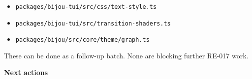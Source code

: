 \begin{itemize}
\item
  \texttt{p\allowbreak{}a\allowbreak{}c\allowbreak{}k\allowbreak{}a\allowbreak{}g\allowbreak{}e\allowbreak{}s\allowbreak{}/\allowbreak{}b\allowbreak{}i\allowbreak{}j\allowbreak{}o\allowbreak{}u\allowbreak{}-\allowbreak{}t\allowbreak{}u\allowbreak{}i\allowbreak{}/\allowbreak{}s\allowbreak{}r\allowbreak{}c\allowbreak{}/\allowbreak{}c\allowbreak{}s\allowbreak{}s\allowbreak{}/\allowbreak{}t\allowbreak{}e\allowbreak{}x\allowbreak{}t\allowbreak{}-\allowbreak{}s\allowbreak{}t\allowbreak{}y\allowbreak{}l\allowbreak{}e\allowbreak{}.\allowbreak{}t\allowbreak{}s}
\item
  \texttt{p\allowbreak{}a\allowbreak{}c\allowbreak{}k\allowbreak{}a\allowbreak{}g\allowbreak{}e\allowbreak{}s\allowbreak{}/\allowbreak{}b\allowbreak{}i\allowbreak{}j\allowbreak{}o\allowbreak{}u\allowbreak{}-\allowbreak{}t\allowbreak{}u\allowbreak{}i\allowbreak{}/\allowbreak{}s\allowbreak{}r\allowbreak{}c\allowbreak{}/\allowbreak{}t\allowbreak{}r\allowbreak{}a\allowbreak{}n\allowbreak{}s\allowbreak{}i\allowbreak{}t\allowbreak{}i\allowbreak{}o\allowbreak{}n\allowbreak{}-\allowbreak{}s\allowbreak{}h\allowbreak{}a\allowbreak{}d\allowbreak{}e\allowbreak{}r\allowbreak{}s\allowbreak{}.\allowbreak{}t\allowbreak{}s}
\item
  \texttt{p\allowbreak{}a\allowbreak{}c\allowbreak{}k\allowbreak{}a\allowbreak{}g\allowbreak{}e\allowbreak{}s\allowbreak{}/\allowbreak{}b\allowbreak{}i\allowbreak{}j\allowbreak{}o\allowbreak{}u\allowbreak{}/\allowbreak{}s\allowbreak{}r\allowbreak{}c\allowbreak{}/\allowbreak{}c\allowbreak{}o\allowbreak{}r\allowbreak{}e\allowbreak{}/\allowbreak{}t\allowbreak{}h\allowbreak{}e\allowbreak{}m\allowbreak{}e\allowbreak{}/\allowbreak{}g\allowbreak{}r\allowbreak{}a\allowbreak{}p\allowbreak{}h\allowbreak{}.\allowbreak{}t\allowbreak{}s}
\end{itemize}

These can be done as a follow-up batch. None are blocking further RE-017 work.

\textbf{Next actions}

